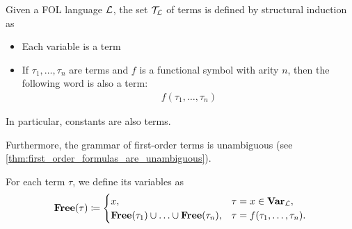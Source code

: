 \begin{definition}\label{def:first_order_term}\cite[definition 2.2]{Nerode2012}
  Given a FOL language $\mathcal L$, the set $\mathcal T_{\mathcal L}$ of terms is defined by structural induction as
  \begin{itemize}
    \item Each variable is a term
    \item If $\tau_1, \ldots, \tau_n$ are terms and $f$ is a functional symbol with arity $n$, then the following word is also a term:
    \begin{align*}
      f(\tau_1, \ldots, \tau_n)
    \end{align*}
  \end{itemize}

  In particular, constants are also terms.

  Furthermore, the grammar of first-order terms is unambiguous (see \cref{thm:first_order_formulas_are_unambiguous}).

  For each term $\tau$, we define its variables as
  \begin{align*}
    \operatorname{\mathbf{Free}}(\tau) \coloneqq \begin{cases}
      x,                                                        &\tau = x \in \operatorname{\mathbf{Var}}_{\mathcal L}, \\
      \operatorname{\mathbf{Free}}(\tau_1) \cup \ldots \cup \operatorname{\mathbf{Free}}(\tau_n), &\tau = f(\tau_1, \ldots, \tau_n).
    \end{cases}
  \end{align*}
\end{definition}

